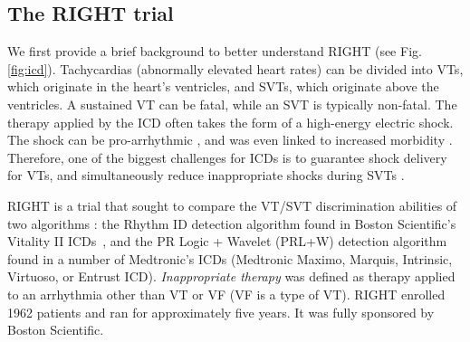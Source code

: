 \subsection{The RIGHT trial}
\label{sec:right}
We first provide a brief background to better understand RIGHT (see Fig.\ref{fig:icd}). Tachycardias (abnormally elevated heart rates) can be divided into \acp{VT}, which originate in the heart's ventricles, 
and \acp{SVT}, which originate above the ventricles.
A sustained \ac{VT} can be fatal, while an \ac{SVT} is typically non-fatal.
The therapy applied by the ICD often takes the form of a high-energy electric shock.
The shock can be pro-arrhythmic
, and was even linked to increased morbidity \cite{shock_mortality}.
Therefore, one of the biggest challenges for ICDs is to guarantee shock delivery for \acp{VT}, and simultaneously reduce inappropriate shocks during \acp{SVT} \cite{Ellenbogen11_Pacingbook}.

RIGHT is a trial that sought to compare the VT/SVT discrimination abilities of two algorithms \cite{GoldABBTB11_RIGHTresults}: 
the Rhythm ID detection algorithm found in Boston Scientific's Vitality II ICDs~\cite{compass},
and the PR Logic + Wavelet (PRL+W) detection algorithm found in a number of Medtronic's ICDs (Medtronic Maximo,
Marquis, Intrinsic, Virtuoso, or Entrust ICD).
\emph{Inappropriate therapy} was defined as therapy applied to an arrhythmia other than \ac{VT} or \ac{VF} (\ac{VF} is a type of \ac{VT}).
RIGHT enrolled 1962 patients and ran for approximately five years.
It was fully sponsored by Boston Scientific. 


